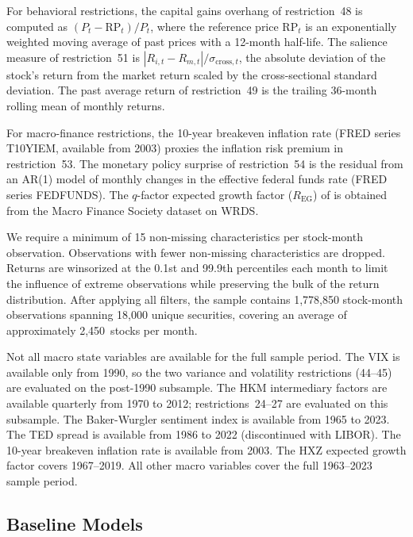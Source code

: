 For behavioral restrictions, the capital gains overhang of restriction~48 is computed as $(P_t - \mathrm{RP}_t)/P_t$, where the reference price $\mathrm{RP}_t$ is an exponentially weighted moving average of past prices with a 12-month half-life.
The salience measure of restriction~51 is $|R_{i,t} - R_{m,t}|/\sigma_{\mathrm{cross},t}$, the absolute deviation of the stock's return from the market return scaled by the cross-sectional standard deviation.
The past average return of restriction~49 is the trailing 36-month rolling mean of monthly returns.

For macro-finance restrictions, the 10-year breakeven inflation rate (FRED series T10YIEM, available from 2003) proxies the inflation risk premium in restriction~53.
The monetary policy surprise of restriction~54 is the residual from an AR(1) model of monthly changes in the effective federal funds rate (FRED series FEDFUNDS).
The $q$-factor expected growth factor ($R_{\mathrm{EG}}$) of \citet{houxuezhang2015} is obtained from the Macro Finance Society dataset on WRDS.

We require a minimum of 15 non-missing characteristics per stock-month observation.
Observations with fewer non-missing characteristics are dropped.
Returns are winsorized at the 0.1st and 99.9th percentiles each month to limit the influence of extreme observations while preserving the bulk of the return distribution.
After applying all filters, the sample contains 1,778,850 stock-month observations spanning 18,000 unique securities, covering an average of approximately 2,450~stocks per month.

Not all macro state variables are available for the full sample period.
The VIX is available only from 1990, so the two variance and volatility restrictions (44--45) are evaluated on the post-1990 subsample.
The HKM intermediary factors are available quarterly from 1970 to 2012; restrictions~24--27 are evaluated on this subsample.
The Baker-Wurgler sentiment index is available from 1965 to 2023.
The TED spread is available from 1986 to 2022 (discontinued with LIBOR).
The 10-year breakeven inflation rate is available from 2003.
The HXZ expected growth factor covers 1967--2019.
All other macro variables cover the full 1963--2023 sample period.

\subsection{Baseline Models}\label{sub:baselines}

